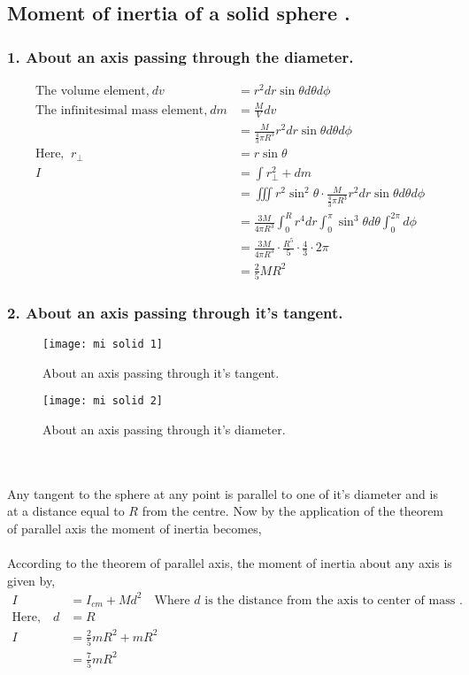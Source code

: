 \subsection{Moment of inertia of a solid sphere .}
\subsubsection{1. About an axis passing through the diameter.}
\begin{align*}
\text{The volume element,}\ dv&= r^{2}dr \sin \theta  d\theta d\phi \\\text{The infinitesimal mass element,} \ dm &=\frac{M}{V} dv\\
&=\frac{M}{\frac{4}{3} \pi R^{3}} r^{2}dr \sin \theta  d\theta d\phi\\
\text{Here, }\ r_{\perp}&=r\sin\theta\\
I&=\int r_{\perp}^{2}+d m\\&=\iiint r^{2} \sin ^{2} \theta \cdot \frac{M}{\frac{4}{3} \pi R^{3}} r^{2} d r \sin \theta d \theta d \phi\\&=\frac{3 M}{4 \pi R^{3}} \int_{0}^{R} r^{4} d r \int_{0}^{\pi} \sin ^{3} \theta d \theta \int_{0}^{2 \pi} d \phi\\
&=\frac{3 M}{4 \pi R^{3}} \cdot \frac{R^{5}}{5} \cdot \frac{4}{3} \cdot 2 \pi\\&=\frac{2}{5} M R^{2}
\end{align*}
\subsubsection{2. About an axis passing through it's tangent.}
\begin{minipage}{0.45\textwidth}
\begin{figure}[H]
	\centering
	\texttt{[image: mi solid 1]}
	\caption{About an axis passing through it's tangent.}
	\label{About an axis passing through it's tangent.}
\end{figure}
\end{minipage}\hfill
\begin{minipage}{0.45\textwidth}
	\begin{figure}[H]
		\centering
		\texttt{[image: mi solid 2]}
		\caption{About an axis passing through it's diameter.}
		\label{About an axis passing through it's diameter.}
	\end{figure}
\end{minipage}\\\\
Any tangent to the sphere at any point is parallel to one of it's diameter and is at  a distance equal to $R$ from the centre.  Now by the application of the theorem of parallel axis  the moment of inertia becomes,\\\\
According to the theorem of parallel axis, the moment of inertia about any axis is given by,
\begin{align*}
I&= I_{cm}+M d^{2}\quad  \text{Where $d$ is the distance from the axis to center of mass .}\\
\text{Here,}\quad d&=R\\
I&=\frac{2}{5} m R^{2}+m R^{2}\\&=\frac{7}{5} m R^{2} 
\end{align*}
